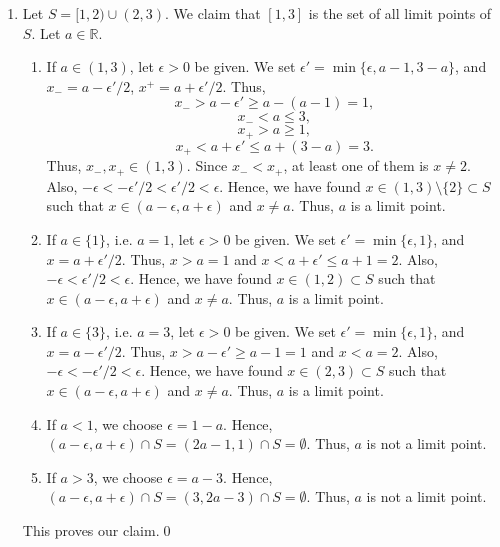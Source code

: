 \documentclass[10pt]{article}
\begin{document}
\begin{enumerate}
                \item Let $S = [1, 2) \cup (2, 3)$. We claim that $[1, 3]$ is the set of all limit points of $S$.
                Let $a \in \mathbb{R}$.
                \begin{enumerate}
                        \item If $a \in (1, 3)$, let $\epsilon > 0$ be given. We set $\epsilon' = \min\{\epsilon, a - 1, 3 - a\}$,
                        and $x_- = a - \epsilon'/2$, $x^+ = a + \epsilon'/2$. Thus, $$x_- > a - \epsilon' \ge a - (a - 1) = 1,$$
                        $$x_- < a \le 3,$$ $$x_+ > a \ge 1,$$ $$x_+ < a + \epsilon' \le a + (3 - a) = 3.$$
                        Thus, $x_-, x_+ \in (1, 3)$. Since $x_- < x_+$, at least one of them is $x \neq 2$.
                        Also, $-\epsilon < -\epsilon'/2 < \epsilon'/2 < \epsilon$.
                        Hence, we have found $x \in (1, 3)\setminus\{2\} \subset S$ such that $x \in (a - \epsilon, a + \epsilon)$ and
                        $x \neq a$. Thus, $a$ is a limit point.

                        \item If $a \in \{1\}$, i.e. $a = 1$, let $\epsilon > 0$ be given. We set $\epsilon' = \min\{\epsilon, 1\}$, and
                        $x = a + \epsilon'/2$. Thus, $x > a = 1$ and $x < a + \epsilon' \le a + 1 = 2$.
                        Also, $-\epsilon < \epsilon'/2 < \epsilon$.
                        Hence, we have found $x \in (1, 2) \subset S$ such that $x \in (a - \epsilon, a + \epsilon)$ and
                        $x \neq a$. Thus, $a$ is a limit point.
                        
                        \item If $a \in \{3\}$, i.e. $a = 3$, let $\epsilon > 0$ be given. We set $\epsilon' = \min\{\epsilon, 1\}$, and
                        $x = a - \epsilon'/2$. Thus, $x > a - \epsilon' \ge a - 1 = 1$ and $x < a = 2$.
                        Also, $-\epsilon < -\epsilon'/2 < \epsilon$.
                        Hence, we have found $x \in (2, 3) \subset S$ such that $x \in (a - \epsilon, a + \epsilon)$ and
                        $x \neq a$. Thus, $a$ is a limit point.

                        \item If $a < 1$, we choose $\epsilon = 1 - a$. Hence, $(a - \epsilon, a + \epsilon) \cap S = 
                        (2a - 1, 1) \cap S = \emptyset$. Thus, $a$ is not a limit point.

                        \item If $a > 3$, we choose $\epsilon = a - 3$. Hence, $(a - \epsilon, a + \epsilon) \cap S =
                        (3, 2a - 3) \cap S = \emptyset$. Thus, $a$ is not a limit point.
                \end{enumerate}
                This proves our claim.\qed


\end{enumerate}
\end{document}
